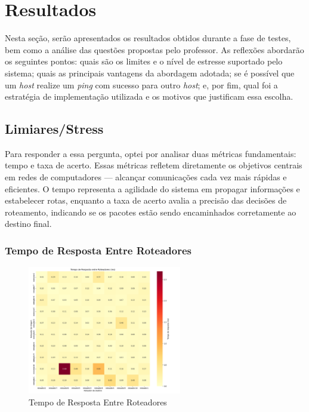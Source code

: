 \documentclass[12pt,a4paper]{report}
\begin{document}
\chapter{Resultados}
Nesta seção, serão apresentados os resultados obtidos durante a fase de testes, bem como a análise das questões propostas pelo professor. As reflexões abordarão os seguintes pontos: quais são os limites e o nível de estresse suportado pelo sistema; quais as principais vantagens da abordagem adotada; se é possível que um \textit{host} realize um \textit{ping} com sucesso para outro \textit{host}; e, por fim, qual foi a estratégia de implementação utilizada e os motivos que justificam essa escolha.

\section{Limiares/Stress}
Para responder a essa pergunta, optei por analisar duas métricas fundamentais: tempo e taxa de acerto. Essas métricas refletem diretamente os objetivos centrais em redes de computadores — alcançar comunicações cada vez mais rápidas e eficientes. O tempo representa a agilidade do sistema em propagar informações e estabelecer rotas, enquanto a taxa de acerto avalia a precisão das decisões de roteamento, indicando se os pacotes estão sendo encaminhados corretamente ao destino final.

\subsection{Tempo de Resposta Entre Roteadores}
\begin{figure}[h!]
    \centering
    \includegraphics[width=0.6\textwidth]{matriz_tempos_resposta.png}
    \caption{Tempo de Resposta Entre Roteadores}
    \label{fig:matriz}
\end{figure}
\end{document}
